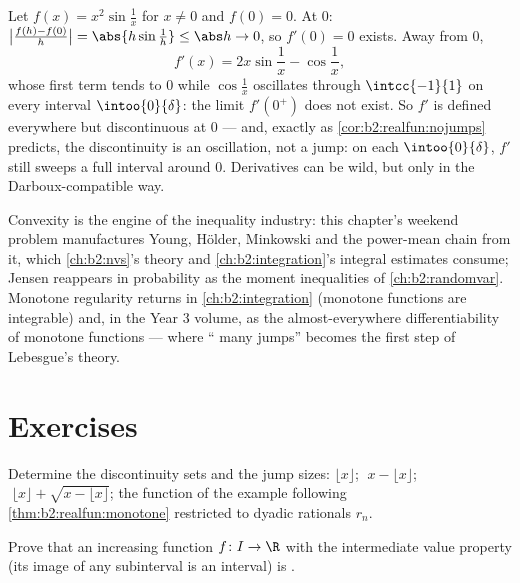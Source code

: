 \begin{example}\label{ex:b2:realfun:oscillation}
Let $f(x) = x^2\sin\frac1x$ for $x \neq 0$ and $f(0) = 0$. At
$0$: $\bigl|\frac{f(h) - f(0)}{h}\bigr| = \abs{h\sin\frac1h}
\leq \abs h \to 0$, so $f'(0) = 0$ exists. Away from $0$,
\[
f'(x) = 2x\sin\frac1x - \cos\frac1x ,
\]
whose first term tends to $0$ while $\cos\frac1x$ oscillates
through $\intcc{-1}{1}$ on every interval $\intoo{0}{\delta}$: the
limit $f'(0^+)$ does not exist. So $f'$ is defined everywhere but
discontinuous at $0$ --- and, exactly as
\cref{cor:b2:realfun:nojumps} predicts, the discontinuity is an
oscillation, not a jump: on each $\intoo{0}{\delta}$, $f'$ still
sweeps a full interval around $0$. Derivatives can be wild, but
only in the Darboux-compatible way.
\end{example}

\begin{remark}
Convexity is the engine of the inequality industry: this
chapter's weekend problem manufactures Young, H\"older, Minkowski
and the power-mean chain from it, which \cref{ch:b2:nvs}'s 
theory and \cref{ch:b2:integration}'s integral estimates consume;
Jensen reappears in probability as the moment inequalities of
\cref{ch:b2:randomvar}. Monotone regularity returns in
\cref{ch:b2:integration} (monotone functions are integrable) and,
in the Year 3 volume, as the almost-everywhere differentiability
of monotone functions --- where `` many jumps'' becomes
the first step of Lebesgue's theory.
\end{remark}

\section{Exercises}

\begin{exercise}[$\star$]\label{exo:b2:realfun:1}
Determine the discontinuity sets and the jump sizes: $\lfloor x
\rfloor$; $\;x - \lfloor x\rfloor$; $\;\lfloor x \rfloor + \sqrt{x
- \lfloor x\rfloor}$; the function of the example following
\cref{thm:b2:realfun:monotone} restricted to dyadic rationals
$r_n$.
\end{exercise}

\begin{exercise}[$\star$]\label{exo:b2:realfun:2}
Prove that an increasing function $f \colon I \to \R$ with the
intermediate value property (its image of any subinterval is an
interval) is .
\end{exercise}

